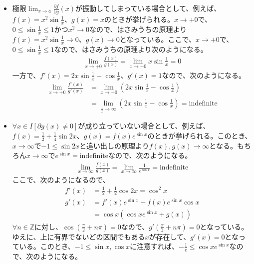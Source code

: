 \documentclass[dvipdfmx]{jsarticle}
\begin{document}
\begin{thm}[l'Hôpitalの定理]
{\begin{itemize}
\begin{align*}
\lim_{x\rightarrow +0}{\frac{f(x)}{g(x)}} &=\lim_{x\rightarrow +0}{\frac{\cos x}{x}} =\infty, \\
\lim_{x\rightarrow +0}{\frac{f'(x)}{g'(x)}} &=\lim_{x\rightarrow +0}{(-\sin x)} =0
\end{align*}
\item
極限$\lim_{x \rightarrow \mathfrak{a}}{\frac{\partial f}{\partial g}(x)}$が振動してしまっている場合として、例えば、$f(x)=x^2 \sin \frac{1}{x}$、$g(x)=x$のときが挙げられる。$x\rightarrow +0$で、$0\leq \sin \frac{1}{x} \leq 1$かつ$x^2 \rightarrow 0$なので、はさみうちの原理より$f(x)=x^2 \sin \frac{1}{x}\rightarrow 0$、$g(x)\rightarrow 0$となっている。ここで、$x\rightarrow +0$で、$0\leq \sin \frac{1}{x} \leq 1$なので、はさみうちの原理より次のようになる。
\begin{align*}
\lim_{x\rightarrow +0}{\frac{f(x)}{g(x)}} =\lim_{x\rightarrow +0}{x\sin \frac{1}{x}} =0
\end{align*}
一方で、$f'(x)=2x\sin \frac{1}{x} -\cos \frac{1}{x}$、$g'(x)=1$なので、次のようになる。
\begin{align*}
\lim_{x\rightarrow +0}{\frac{f'(x)}{g'(x)}} &=\lim_{x\rightarrow +0}{\left( 2x\sin \frac{1}{x} -\cos \frac{1}{x}\right) } \\
&=\lim_{\frac{1}{x} \rightarrow \infty }{\left( 2x\sin \frac{1}{x} -\cos \frac{1}{x}\right) } =\mathrm{indefinite} 
\end{align*}
\item
$\forall x \in I\left[ \partial g(x) \neq 0 \right]$が成り立っていない場合として、例えば、$f(x)=\frac{1}{2} +\frac{1}{4}\sin 2x$、$g(x)=f(x) e^{\sin x}$のときが挙げられる。このとき、$x\rightarrow \infty $で$-1\leq \sin 2x $と追い出しの原理より$f(x),g(x)\rightarrow \infty $となる。もちろん$x\rightarrow \infty $で$e^{\sin x} =\mathrm{indefinite}$なので、次のようになる。
\begin{align*}
\lim_{x\rightarrow \infty }{\frac{f(x)}{g(x)}} =\lim_{x\rightarrow \infty }{\frac{1}{e^{\sin x} }}=\mathrm{indefinite}
\end{align*}
ここで、次のようになるので、
\begin{align*}
f'(x) &= \frac{1}{2} +\frac{1}{2} \cos 2x ={\cos }^2 x\\
g'(x) &= f'(x) e^{\sin x} +f(x) e^{\sin x} \cos x\\
&=\cos x\left( \cos x e^{\sin x} +g(x) \right)
\end{align*}
$\forall n\in \mathbb{Z} $に対し、$\cos \left( \frac{\pi }{2} +n\pi \right) =0$なので、$g' \left( \frac{\pi }{2} +n\pi \right) =0$となっている。ゆえに、上に有界でないどの区間でもある$x$が存在して、$g'(x)=0$となっている。このとき、$-1\leq \sin x, \cos x$に注意すれば、$-\frac{1}{e} \leq \cos x e^{\sin x}$なので、次のようになる。

\end{itemize}}
\end{thm}
\end{document}
